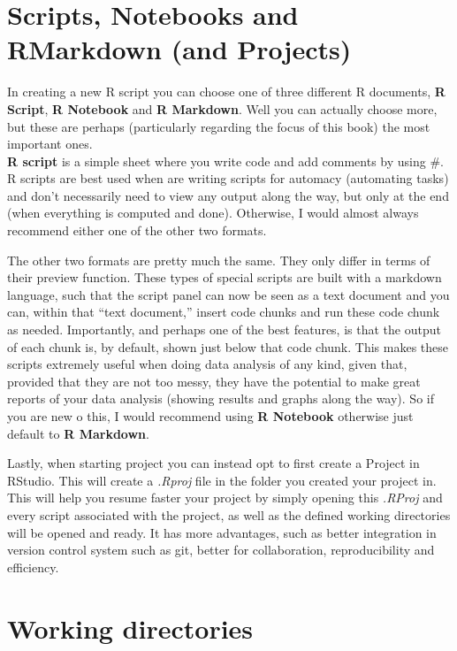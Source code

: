 \documentclass[
]{book}
\begin{document}
\hypertarget{scripts-notebooks-and-rmarkdown-and-projects}{%
\section{Scripts, Notebooks and RMarkdown (and Projects)}\label{scripts-notebooks-and-rmarkdown-and-projects}}

In creating a new R script you can choose one of three different R documents, \textbf{R Script}, \textbf{R Notebook} and \textbf{R Markdown}.
Well you can actually choose more, but these are perhaps (particularly regarding the focus of this book) the most important ones.\\

\textbf{R script} is a simple sheet where you write code and add comments by using \#.
R scripts are best used when are writing scripts for automacy (automating tasks) and don't necessarily need to view any output along the way, but only at the end (when everything is computed and done).
Otherwise, I would almost always recommend either one of the other two formats.

The other two formats are pretty much the same.
They only differ in terms of their preview function.
These types of special scripts are built with a markdown language, such that the script panel can now be seen as a text document and you can, within that ``text document,'' insert code chunks and run these code chunk as needed.
Importantly, and perhaps one of the best features, is that the output of each chunk is, by default, shown just below that code chunk.
This makes these scripts extremely useful when doing data analysis of any kind, given that, provided that they are not too messy, they have the potential to make great reports of your data analysis (showing results and graphs along the way).
So if you are new o this, I would recommend using \textbf{R Notebook} otherwise just default to \textbf{R Markdown}.

Lastly, when starting project you can instead opt to first create a Project in RStudio.
This will create a \emph{.Rproj} file in the folder you created your project in.
This will help you resume faster your project by simply opening this \emph{.RProj} and every script associated with the project, as well as the defined working directories will be opened and ready.
It has more advantages, such as better integration in version control system such as git, better for collaboration, reproducibility and efficiency.

\hypertarget{working-directories}{%
\section{Working directories}\label{working-directories}}
\end{document}
